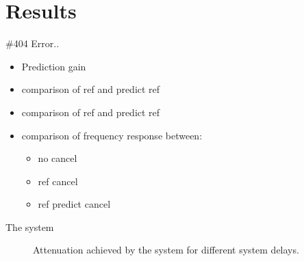 \section*{Results}

\#404 Error..

\begin{itemize}
\item Prediction gain
\item comparison of ref and predict ref
\item comparison of ref and predict ref
\item comparison of frequency response between:
\begin{itemize}
	\item no cancel
	\item ref cancel
	\item ref predict cancel
\end{itemize}
\end{itemize}


The system 
\begin{figure}[H]
	\centering
	
	\caption{Attenuation achieved by the system for different system delays.}
	\label{Fig:Reference to noise ratio}
\end{figure}



